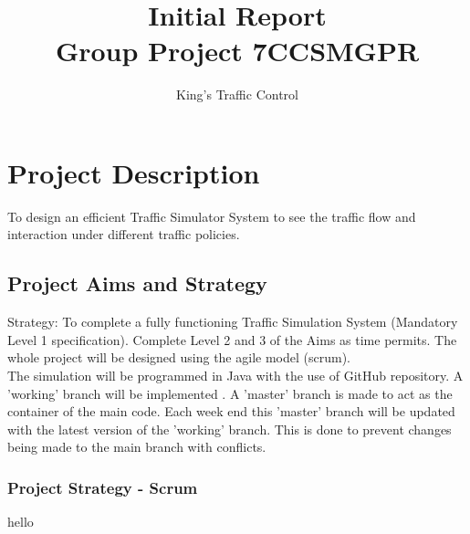 \documentclass{article} \usepackage{graphicx}
\begin{document}
	
	\title{Initial Report
    \\ Group Project 7CCSMGPR} 	
    \author{King's Traffic Control}
	\maketitle
	
	 \section{Project Description} 		
        To design an efficient Traffic Simulator System to see the traffic flow and interaction under different traffic policies.
        
         \subsection{Project Aims and Strategy}
          Strategy: To complete a fully functioning Traffic Simulation System (Mandatory Level
           1 specification). Complete Level 2 and 3 of the Aims as time permits. The whole project will be designed using the agile model (scrum).
         \\The simulation will be programmed in Java with the use of GitHub repository. A 'working'
          branch will be implemented . A 'master' branch is made to act as the container of the main
           code. Each week end this 'master' branch will be updated with the latest version of the 
           'working' branch. This is done to prevent changes being made to the main branch 
           with conflicts.
			\subsubsection{Project Strategy - Scrum}
			hello\\
\end{document}
